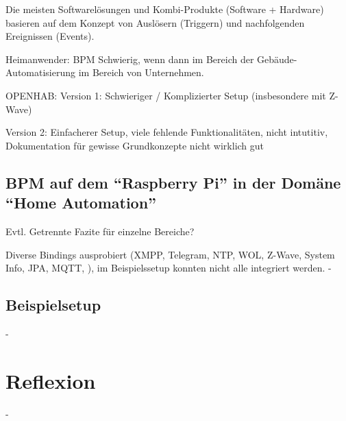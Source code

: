 Die meisten Softwarelösungen und Kombi-Produkte (Software + Hardware) basieren auf dem Konzept von Auslösern (Triggern) und nachfolgenden Ereignissen (Events).

Heimanwender: BPM Schwierig, wenn dann im Bereich der Gebäude-Automatisierung im Bereich von Unternehmen.


OPENHAB:
Version 1: Schwieriger / Komplizierter Setup (insbesondere mit Z-Wave)

Version 2: Einfacherer Setup, viele fehlende Funktionalitäten, nicht intutitiv, Dokumentation für gewisse Grundkonzepte nicht wirklich gut

\subsection{BPM auf dem "`Raspberry Pi"' in der Domäne "`Home Automation"'}\label{subsec:Fazit:BPMN:RPI:HA}
Evtl. Getrennte Fazite für einzelne Bereiche?

Diverse Bindings ausprobiert (XMPP, Telegram, NTP, WOL, Z-Wave, System Info, JPA, MQTT, ), im Beispielssetup konnten nicht alle integriert werden.
-

\subsection{Beispielsetup}
-




\section{Reflexion}
-



